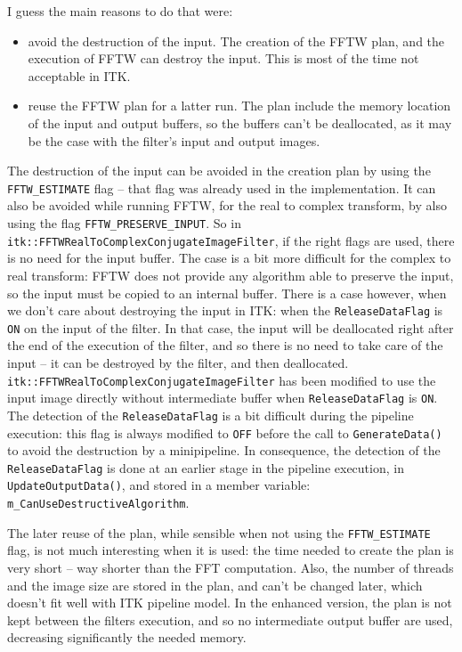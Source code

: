 \documentclass{InsightArticle}
\begin{document}
I guess the main reasons to do that were:
\begin{itemize}
  \item avoid the destruction of the input. The creation of the FFTW plan, and the execution of FFTW 
  can destroy the input. This is most of the time not acceptable in ITK.
  \item reuse the FFTW plan for a latter run. The plan include the memory location of the input and output
  buffers, so the buffers can't be deallocated, as it may be the case with the filter's input and output images.
\end{itemize}

The destruction of the input can be avoided in the creation plan by using the \verb$FFTW_ESTIMATE$ flag
-- that flag was already used in the implementation. It can also be avoided while running FFTW, for 
the real to complex transform, by also using the flag \verb$FFTW_PRESERVE_INPUT$. So in 
\verb$itk::FFTWRealToComplexConjugateImageFilter$, if the right flags are used, there is no need for
the input buffer.
The case is a bit
more difficult for the complex to real transform: FFTW does not provide any algorithm able to preserve
the input, so the input must be copied to an internal buffer. There is a case however, when we don't
care about destroying the input in ITK: when the \verb$ReleaseDataFlag$ is \verb$ON$ on the input of the filter.
In that case, the input will be deallocated right after the end of the execution of the filter, and so
there is no need to take care of the input -- it can be destroyed by the filter, and then deallocated.
\verb$itk::FFTWRealToComplexConjugateImageFilter$ has been modified to use the input image directly without 
intermediate buffer when \verb$ReleaseDataFlag$ is \verb$ON$. The detection of the \verb$ReleaseDataFlag$
is a bit difficult during the pipeline 
execution: this flag is always modified to \verb$OFF$ before the call to \verb$GenerateData()$ to avoid the 
destruction by a minipipeline. In consequence, the detection of the \verb$ReleaseDataFlag$ is done at an 
earlier stage in the pipeline execution, in \verb$UpdateOutputData()$, and stored in a member variable:
\verb$m_CanUseDestructiveAlgorithm$.

The later reuse of the plan, while sensible when not using the \verb$FFTW_ESTIMATE$ flag, is not much 
interesting when it is used: the time needed to create the plan is very short -- way shorter than the
FFT computation. Also, the number of threads and the image size are stored in the plan, and can't be 
changed later, which doesn't fit well with ITK pipeline model. In the enhanced version, the plan is
not kept between the filters execution, and so no intermediate output buffer are used, decreasing 
significantly the needed memory.
\end{document}
